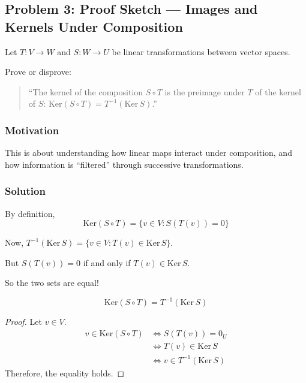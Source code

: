 \documentclass[12pt]{article}
\theoremstyle{definition}
\theoremstyle{plain}
\begin{document}
\subsection{Problem 3: Proof Sketch — Images and Kernels Under Composition}

Let \( T: V \to W \) and \( S: W \to U \) be linear transformations between vector spaces.

Prove or disprove:

\begin{quote}
    ``The kernel of the composition \( S \circ T \) is the preimage under \( T \) of the kernel of \( S \): \(
    \mathrm{Ker}(S \circ T) = T^{-1}(\mathrm{Ker}\,S)
    \).''
\end{quote}

\subsubsection*{Motivation}

This is about understanding how linear maps interact under composition, and how information is ``filtered'' through successive transformations.

\subsubsection*{Solution}

By definition,
\[
\mathrm{Ker}(S \circ T) = \{ v \in V : S(T(v)) = 0 \}
\]

Now, \( T^{-1}(\mathrm{Ker}\,S) = \{ v \in V : T(v) \in \mathrm{Ker}\,S \} \).

But \( S(T(v)) = 0 \) if and only if \( T(v) \in \mathrm{Ker}\,S \).

So the two sets are equal!

\[
\boxed{
\mathrm{Ker}(S \circ T) = T^{-1}(\mathrm{Ker}\,S)
}
\]

\begin{proof}[Proof]
Let \( v \in V \).
\begin{align*}
v \in \mathrm{Ker}(S \circ T) 
&\iff S(T(v)) = 0_{U} \\
&\iff T(v) \in \mathrm{Ker}\,S \\
&\iff v \in T^{-1}(\mathrm{Ker}\,S)
\end{align*}
Therefore, the equality holds.
\end{proof}
\end{document}

